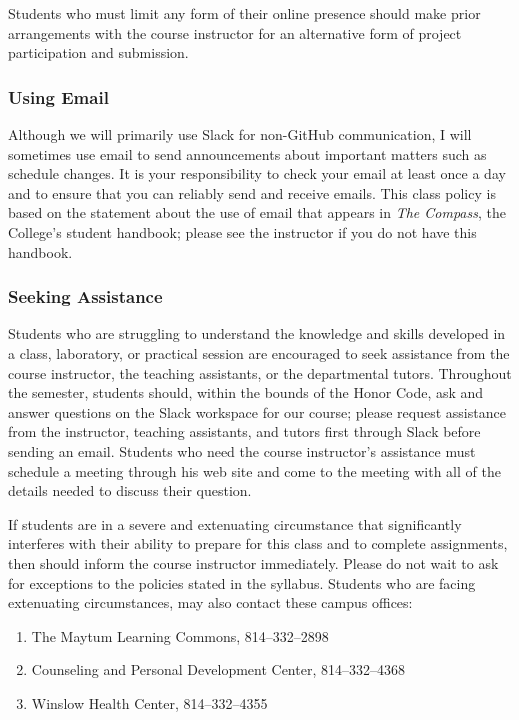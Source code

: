 \documentclass[11pt]{article}
\newcommand{\instructorpronoun}[1]{his}
\begin{document}
Students who must limit any form of their online presence should make prior
arrangements with the course instructor for an alternative form of project
participation and submission.

\subsubsection*{Using Email}

Although we will primarily use Slack for non-GitHub communication, I will
sometimes use email to send announcements about important matters such as
schedule changes. It is your responsibility to check your email at least once a
day and to ensure that you can reliably send and receive emails. This class
policy is based on the statement about the use of email that appears in {\em The
Compass}, the College's student handbook; please see the instructor if you do
not have this handbook.

\subsubsection*{Seeking Assistance}

Students who are struggling to understand the knowledge and skills developed in
a class, laboratory, or practical session are encouraged to seek assistance from
the course instructor, the teaching assistants, or the departmental tutors.
Throughout the semester, students should, within the bounds of the Honor Code,
ask and answer questions on the Slack workspace for our course; please request
assistance from the instructor, teaching assistants, and tutors first through
Slack before sending an email. Students who need the course instructor's
assistance must schedule a meeting through \instructorpronoun{} web site and
come to the meeting with all of the details needed to discuss their question.

If students are in a severe and extenuating circumstance that significantly
interferes with their ability to prepare for this class and to complete
assignments, then should inform the course instructor immediately. Please do not
wait to ask for exceptions to the policies stated in the syllabus. Students who
are facing extenuating circumstances, may also contact these campus offices:

\begin{enumerate}

  \item The Maytum Learning Commons, 814--332--2898

  \item Counseling and Personal Development Center, 814--332--4368

  \item Winslow Health Center, 814--332--4355

\end{enumerate}
\end{document}
